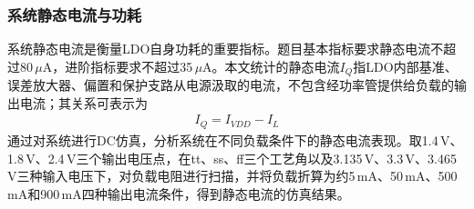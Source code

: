 \documentclass[a4paper, 12pt]{article}
\begin{document}
\subsubsection{系统静态电流与功耗}

系统静态电流是衡量LDO自身功耗的重要指标。题目基本指标要求静态电流不超过80\,$\mu$A，进阶指标要求不超过35\,$\mu$A。本文统计的静态电流$I_Q$指LDO内部基准、误差放大器、偏置和保护支路从电源汲取的电流，不包含经功率管提供给负载的输出电流；其关系可表示为
\begin{gather}
  I_Q = I_{VDD}-I_L
\end{gather}
通过对系统进行DC仿真，分析系统在不同负载条件下的静态电流表现。取1.4\,V、1.8\,V、2.4\,V三个输出电压点，在tt、ss、ff三个工艺角以及3.135\,V、3.3\,V、3.465\,V三种输入电压下，对负载电阻进行扫描，并将负载折算为约5\,mA、50\,mA、500\,mA和900\,mA四种输出电流条件，得到静态电流的仿真结果。
\end{document}

